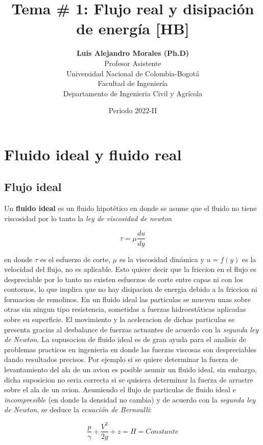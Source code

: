 \documentclass[10pt, oneside]{article}
\title{Tema \# 1: Flujo real y disipaci\'on de energ\'ia [HB]}
\author{\textbf{Luis Alejandro Morales (Ph.D)}\\ \vspace{0.4cm} Profesor Asistente \\ Universidad Nacional de Colombia-Bogot\'a\\Facultad de Ingenier\'ia \\ Departamento de Ingenieria Civil y Agr\'icola}
\date{Periodo 2022-II}
\begin{document}
\maketitle
\tableofcontents


\section{Fluido ideal y fluido real}
\subsection{Flujo ideal}
Un \textbf{fluido ideal} es un fluido hipot\'etico en donde  se asume que el fluido no tiene viscosidad por lo tanto la \emph{ley de viscosidad de newton} 

\begin{equation}
\tau = \mu \frac{du}{dy}
\end{equation}

en donde $\tau$ es el esfuerzo de corte, $\mu$ es la viscosidad din\'amica y $u=f(y)$ es la velocidad del flujo, no es aplicable. Esto quiere decir que la friccion en el flujo es despreciable por lo tanto  no existen esfuerzos de corte entre capas ni con los contornos, lo que implica que no hay disipacion de energia debido a la friccion ni formacion de remolinos. En un fluido ideal las particulas se mueven unas sobre otras sin ningun tipo resistencia, sometidas a fuerzas hidroest\'aticas aplicadas sobre su superficie. El movimiento y la aceleracion de dichas particulas se presenta gracias al desbalance de fuerzas actuantes de acuerdo con la \emph{segunda ley de Newton}. La supusocion de fluido ideal es de gran ayuda para el analisis de problemas practicos en ingenieria en donde las fuerzas viscosas son despreciables dando resultados precisos. Por ejemplo si se quiere determinar la fuerza de levantamiento del ala de un avion es posible asumir un fluido ideal, sin embargo, dicha suposicion no seria correcta si se quisiera determinar la fuerza de arrastre sobre el ala de un avion. Asumiendo el flujo de particulas de fluido ideal e \emph{incompresible} (en donde la densidad no cambia) y de acuerdo con la \emph{segunda ley de Newton}, se deduce la \emph{ecuaci\'on de Bernoulli}:

\begin{equation}
\frac{p}{\gamma} + \frac{V^2}{2g}+z = H = Constante
\end{equation}
\end{document}
